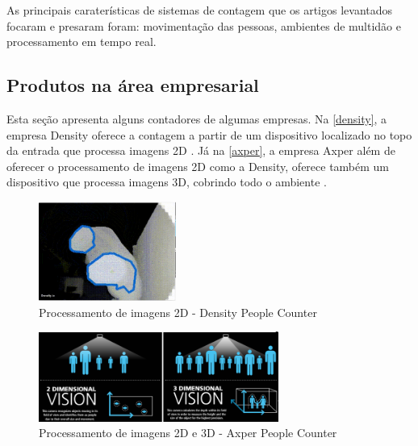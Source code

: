   As principais caraterísticas de sistemas de contagem que os artigos levantados focaram e presaram foram: movimentação das pessoas,
  ambientes de multidão e processamento em tempo real.

\subsection{Produtos na área empresarial}
\label{produtos-empresas}
Esta seção apresenta alguns contadores de algumas empresas. Na \autoref{density}, a empresa Density oferece a contagem a partir de um
dispositivo localizado no topo da entrada que processa imagens 2D \cite{Density2017}. Já na \autoref{axper}, a empresa Axper além de oferecer
o processamento de imagens 2D como a Density, oferece também um dispositivo que processa imagens 3D, cobrindo todo o ambiente \cite{Axper2017}.

\begin{figure}[htb]
  \caption{\label{density}Processamento de imagens 2D - Density People Counter}
  \begin{center}
    \includegraphics[width=0.40\textwidth]{img/density.png}
  \end{center}
\end{figure}

\begin{figure}[htb]
  \caption{\label{axper}Processamento de imagens 2D e 3D - Axper People Counter}
  \begin{center}
    \includegraphics[width=0.70\textwidth]{img/axper.png}
  \end{center}
\end{figure}

